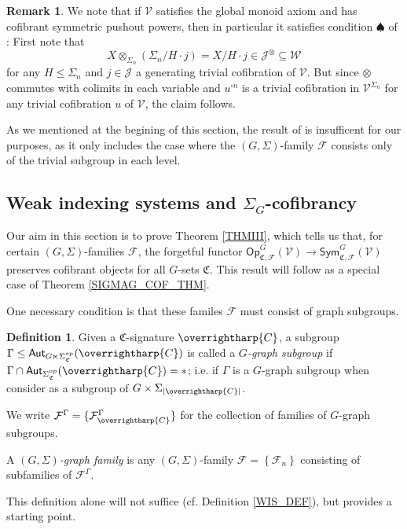 \documentclass[a4paper,10pt
,draft
]{article}%
\numberwithin{equation}{section}
\numberwithin{figure}{section}
\theoremstyle{definition} %
\newtheorem{definition}[equation]{Definition}%
\newtheorem{remark}[equation]{Remark}%
\newcommand{\set}[1]{\left\{#1\right\}}%
\newcommand{\vect}[1]{\text{\overrightharp{\ensuremath{#1}}}}
\newcommand{\Sym}{\ensuremath{\mathsf{Sym}}}%
\newcommand{\Op}{\mathsf{Op}}%
\newcommand{\F}{\ensuremath{\mathcal F}}
\newcommand{\V}{\ensuremath{\mathcal V}}
\newcommand{\1}{\ensuremath{\mathbbm 1}}%
\begin{document}
\begin{remark}
      We note that if $\V$ satisfies the global monoid axiom and has cofibrant symmetric pushout powers,
      then in particular it satisfies condition $\spadesuit$ of \cite[Thm. 6.1.1]{WY18}:
      First note that
      \[
            X \otimes_{\Sigma_n} (\Sigma_n / H \cdot j) = X/H \cdot j \in \mathcal J^{\otimes} \subseteq \mathcal W
      \]
      for any $H \leq \Sigma_n$ and $j \in \mathcal J$ a generating trivial cofibration of $\V$.
      But since $\otimes$ commutes with colimits in each variable
      and $u^{\square n}$ is a trivial cofibration in $\V^{\Sigma_n}$ for any trivial cofibration $u$ of $\V$,
      the claim follows.

      As we mentioned at the begining of this section, the result of \cite[Thm. 6.1.1]{WY18} is insufficent for our purposes,
      as it only includes the case where
      the $(G,\Sigma)$-family $\F$ consists only of the trivial subgroup in each level.
\end{remark}






\newpage
\subsection{Weak indexing systems and $\Sigma_G$-cofibrancy}
\label{INDSYS SEC}

Our aim in this section is to prove Theorem \ref{THMIII},
which tells us that, for certain $(G,\Sigma)$-families $\F$, the forgetful functor
$\Op^G_{\mathfrak C, \F}(\V) \to \Sym^G_{\mathfrak C, \F}(\V)$ preserves cofibrant objects for all $G$-sets $\mathfrak C$.
This result will follow as a special case of Theorem \ref{SIGMAG_COF_THM}.

One necessary condition is that these familes $\F$ must consist of graph subgroups.
\begin{definition}
      \label{GRAPHSUB_DEF}
      Given a $\mathfrak{C}$-signature $\vect C$, 
      a subgroup 
      $\Gamma \leq \mathsf{Aut}_{G \ltimes \Sigma_{\mathfrak{C}}^{op}}(\vect C)$
      is called a \textit{$G$-graph subgroup} if
      $\Gamma \cap \mathsf{Aut}_{\Sigma_{\mathfrak{C}}^{op}}(\vect C) = \**$;
      i.e. if $\Gamma$ is a $G$-graph subgroup when consider as a subgroup of $G \times \Sigma_{|\vect C|}$.
      
      We write $\mathcal{F}^{\Gamma} = \{\mathcal{F}^{\Gamma}_{\vect C}\}$
      for the collection of families of $G$-graph subgroups.

      A \textit{$(G,\Sigma)$-graph family} is any $(G,\Sigma)$-family $\mathcal F = \set{\F_n}$ consisting of subfamilies of $\F^\Gamma$.
\end{definition}
This definition alone will not suffice (cf. Definition \ref{WIS_DEF}), but provides a starting point.
\end{document}
